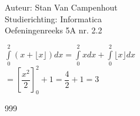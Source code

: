 \documentclass[a4paper]{article}
\begin{document}
  
\noindent \large Auteur: Stan Van Campenhout \\
\noindent \large Studierichting:  Informatica\\
\noindent \large Oefeningenreeks 5A nr. 2.2\\

\medskip

\normalsize

$ \displaystyle\int\limits_0^2\left(x+\lfloor x\rfloor\right) dx = \displaystyle\int\limits_0^2xdx+\displaystyle\int\limits_0^2\lfloor x\rfloor dx $\\

$ = \left[\dfrac{x^2}{2}\right]_0^2 + 1 = \dfrac{4}{2} + 1 = 3 $\\

\begin{thebibliography}{999}
\end{thebibliography}
\end{document}
